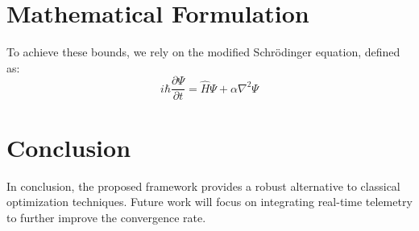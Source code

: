 \documentclass[journal]{IEEEtran}
\begin{document}
\section{Mathematical Formulation}
To achieve these bounds, we rely on the modified Schr\"{o}dinger equation, defined as:
\begin{equation}
i\hbar \frac{\partial \Psi}{\partial t} = \hat{H}\Psi + \alpha \nabla^2 \Psi
\end{equation}

\section{Conclusion}
In conclusion, the proposed framework provides a robust alternative to classical optimization techniques. Future work will focus on integrating real-time telemetry to further improve the convergence rate.
\end{document}
